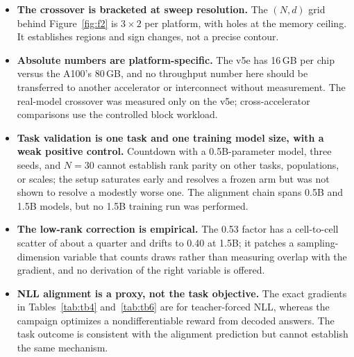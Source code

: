 \begin{itemize}
    and embedding lookups must route through \texttt{shardes.nn}; an existing
    model does not run unmodified, and unsupported layer types require a new
    seam. This is the API cost of never materializing low-rank noise.
  \item \textbf{The crossover is bracketed at sweep resolution.} The $(N,d)$
    grid behind Figure~\ref{fig:f2} is $3\times2$ per platform, with holes at
    the memory ceiling. It establishes regions and sign changes, not a precise
    contour.
  \item \textbf{Absolute numbers are platform-specific.} The v5e has 16\,GB
    per chip versus the A100's 80\,GB, and no throughput number here should be
    transferred to another accelerator or interconnect without measurement.
    The real-model crossover was measured only on the v5e; cross-accelerator
    comparisons use the controlled block workload.
  \item \textbf{Task validation is one task and one training model size,
    with a weak positive control.} Countdown with a 0.5B-parameter model,
    three seeds, and $N{=}30$ cannot
    establish rank parity on other tasks, populations, or scales; the
    setup saturates early and resolves a frozen arm but was not shown to
    resolve a modestly worse one. The
    alignment chain spans 0.5B and 1.5B models, but no 1.5B training run was
    performed.
  \item \textbf{The low-rank correction is empirical.} The 0.53 factor has a
    cell-to-cell scatter of about a quarter and drifts to 0.40 at 1.5B; it
    patches a sampling-dimension variable that counts draws rather than
    measuring overlap with the gradient, and no derivation of the right
    variable is offered.
  \item \textbf{NLL alignment is a proxy, not the task objective.} The exact
    gradients in Tables~\ref{tab:tb4} and~\ref{tab:tb6} are for
    teacher-forced NLL, whereas the campaign optimizes a nondifferentiable
    reward from decoded answers. The task outcome is consistent with the
    alignment prediction but cannot establish the same mechanism.
\end{itemize}
